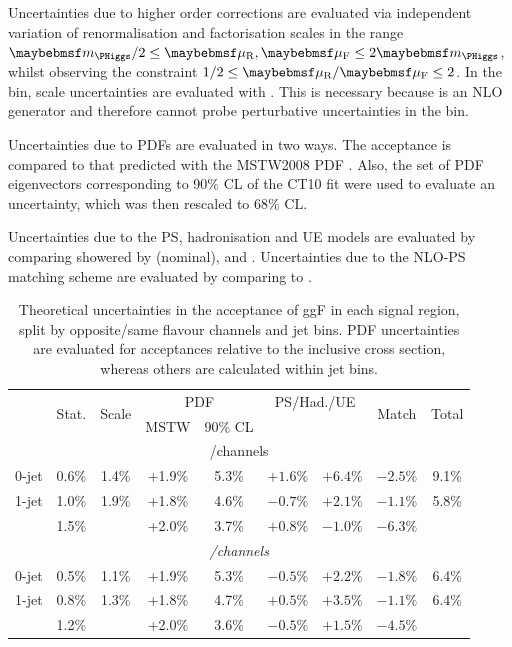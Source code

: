 Uncertainties due to higher order corrections are evaluated via independent variation of 
renormalisation and factorisation scales in the range $\mH/2 \leq \mur,\muf \leq 2\mH$, 
whilst observing the constraint $1/2 \leq \mur/\muf \leq 2$. In the \twojet bin, scale 
uncertainties are evaluated  with \mcfm 
\cite{MCFM:H2j}. This is necessary because \powhegbox is an NLO generator and therefore 
cannot probe perturbative uncertainties in the \twojet bin.

Uncertainties due to \acp{PDF} are evaluated in two ways. The acceptance is compared to 
that predicted with the MSTW2008 PDF \cite{MSTW}. Also, the set of PDF eigenvectors 
corresponding to 90\% \ac{CL} of the CT10 fit were used to evaluate an uncertainty, 
which was then rescaled to 68\% \ac{CL}.

Uncertainties due to the \ac{PS}, hadronisation and \ac{UE} models are evaluated by 
comparing \powhegbox showered by  (nominal),  and \fherwig. 
Uncertainties due to the NLO-PS matching scheme are evaluated by comparing 
\meps{\powhegbox}{\fherwig} to \meps{\mcatnlo}{\herwigpp}.


\begin{table}
	\begin{tabular}{r|ccccccc|c}
		& \multirow{2}{*}{Stat.} & \multirow{2}{*}{Scale} & \multicolumn{2}{c}{PDF} & \multicolumn{2}{c}{PS/Had./UE} & \multirow{2}{*}{Match} & \multirow{2}{*}{Total} \\
		& & & MSTW & 90\% CL & \pythia{6} & \fherwig & & \\
		\hline
		\multicolumn{9}{c}{\ee/\mm channels} \\
		\hline
		0-jet   & 0.6\% & 1.4\% & +1.9\% & 5.3\% & $+1.6\%$ & $+6.4\%$ & $-2.5\%$ & 9.1\% \\
		1-jet   & 1.0\% & 1.9\% & +1.8\% & 4.6\% & $-0.7\%$ & $+2.1\%$ & $-1.1\%$ & 5.8\% \\
		\twojet & 1.5\% &       & +2.0\% & 3.7\% & $+0.8\%$ & $-1.0\%$ & $-6.3\%$ &  \\
		\hline
		\multicolumn{9}{c}{\em/\me channels} \\
		\hline
		0-jet   & 0.5\% & 1.1\% & +1.9\% & 5.3\% & $-0.5\%$ & $+2.2\%$ & $-1.8\%$ & 6.4\% \\
		1-jet   & 0.8\% & 1.3\% & +1.8\% & 4.7\% & $+0.5\%$ & $+3.5\%$ & $-1.1\%$ & 6.4\% \\
		\twojet & 1.2\% &       & +2.0\% & 3.6\% & $-0.5\%$ & $+1.5\%$ & $-4.5\%$ &  \\
	\end{tabular}
	\caption{Theoretical uncertainties in the acceptance of ggF in each signal 
	region, split by opposite/same flavour channels and jet bins. PDF uncertainties are
	evaluated for acceptances relative to the inclusive cross section, whereas others are
	calculated within jet bins.}
	\label{tab:signal:acc_unc_summary}
\end{table}

